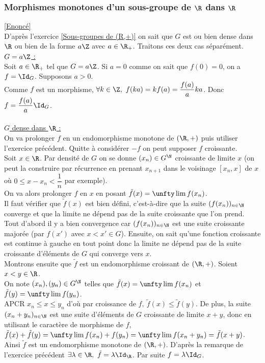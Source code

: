 \documentclass[8pt]{book}
\begin{document}
	\subsubsection{Morphismes monotones d'un sous-groupe de $\R$ dans $\R$ }
	\label{Morphismes monotones d'un sous-groupe de R dans R corrigé}
	\textcolor{blue}{\hyperref[Morphismes monotones d'un sous-groupe de R dans R]{[Enoncé]}}\\
	D'après l'exercice \ref{Sous-groupes de (R,+)} on sait que $G$ est ou bien dense dans $\R$ ou bien de la forme $a\Z$ avec $a\in \R_+$. Traitons ces deux cas séparément.\\
	\underline{$G=a\Z$ :}\\
	Soit $a\in \R_+$ tel que $G=a\Z$. Si $a=0$ comme on sait que $f(0)=0$, on a $f=\Id_G$. Supposons $a>0$.\\
	Comme $f$ est un morphisme, $\forall k\in \Z,\ f(ka)=kf(a)=\dfrac{f(a)}{a}ka$. Donc $f=\dfrac{f(a)}{a}\Id_G$.\\\\
	\underline{$G$ dense dans $\R$ :}\\
	On va prolonger $f$ en un endomorphisme monotone de $(\R,+)$ puis utiliser l'exercice précédent. Quitte à considérer $-f$ on peut supposer $f$ croissante.\\
	Soit $x\in \R$. Par densité de $G$ on se donne $(x_n)\in G^\N$ croissante de limite $x$ (on peut la construire par récurrence en prenant $x_{n+1}$ dans le voisinage $\left[x_n,x\right]$ de $x$ où $0\leq x-x_n<\dfrac{1}{n}$ par exemple).\\
	On va alors prolonger $f$ en $x$ en posant $\tilde f(x)=\unfty\lim f(x_n)$.\\
	Il faut vérifier que $\tilde f(x)$ est bien défini, c'est-à-dire que la suite $(f(x_n))_{n\in \N}$ converge et que la limite ne dépend pas de la suite croissante que l'on prend.\\
	Tout d'abord il y a bien convergence car $(f(x_n))_{n\in \N}$ est une suite croissante majorée (par $f(x')$ avec $x<x'\in G$). Ensuite, on sait qu'une fonction croissante est continue à gauche en tout point donc la limite ne dépend pas de la suite croissante d'éléments de $G$ qui converge vers $x$.\\
	Montrons ensuite que $\tilde f$ est un endomorphisme croissant de $(\R,+)$. Soient $x<y\in \R$.\\
	On note $(x_n),(y_n)\in G^\N$ telles que $\tilde f(x)=\unfty\lim f(x_n)$ et $\tilde f(y)=\unfty\lim f(y_n)$.\\
	APCR $x_n\leq x\leq y_n$ d'où par croissance de $f,\ \tilde f(x)\leq \tilde f(y)$. De plus, la suite $(x_n+y_n)_{n\in \N}$ est une suite d'éléments de $G$ croissante de limite $x+y$, donc en utilisant le caractère de morphisme de $f$, $\tilde f(x)+\tilde f(y)=\unfty\lim f(x_n)+f(y_n)=\unfty\lim f(x_n+y_n)=\tilde f(x+y)$.\\
	Ainsi $\tilde f$ est un endomorphisme monotone de $(\R,+)$. D'après la remarque de l'exercice précédent $\exists \lambda\in \R,\ \tilde f=\lambda\Id_\R$. Par suite $f=\lambda\Id_G$.
	
\end{document}

